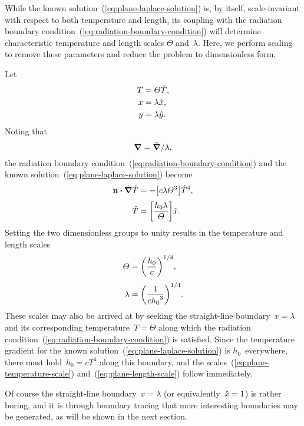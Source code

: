 While the known solution~(\ref{eq:plane-laplace-solution}) is, by itself,
scale-invariant with respect to both temperature and length,
its coupling with
the radiation boundary condition~(\ref{eq:radiation-boundary-condition})
will determine characteristic temperature and length scales
$\Theta$ and~$\lambda$.
Here, we perform scaling to remove these parameters
and reduce the problem to dimensionless form.

Let
\begin{align}
  T &= \varTheta \hat{T}, \label{eq:plane-temperature-scaling} \\
  x &= \lambda \hat{x}, \label{eq:plane-x-scaling} \\
  y &= \lambda \hat{y}. \label{eq:plane-y-scaling}
\end{align}
Noting that
\begin{equation}
  \mathop{}\!\boldsymbol{\mathbf{\nabla}} = \mathop{}\!\hat{\mathop{}\!\boldsymbol{\mathbf{\nabla}}} / \lambda,
  \label{eq:plane-del-scaling}
\end{equation}
the radiation boundary condition~(\ref{eq:radiation-boundary-condition})
and the known solution~(\ref{eq:plane-laplace-solution})
become
\begin{align}
  \normalvec \dotp \scaleddel \scaled{T}
    &= -\group{c \lambda \Theta^3} \scaled{T}^4,
    \label{eq:plane-scaled-radiation-boundary-condition-with-groups}
    \\[\tallspace]
  \scaled{T}
    &= \group{\frac{h_0 \lambda}{\Theta}} \scaled{x}.
    \label{eq:plane-scaled-laplace-solution-with-groups}
\end{align}
Setting the two dimensionless groups to unity
results in the temperature and length scales
\begin{align}
  \Theta &= \roundbr*{\frac{h_0}{c}}^{1/4},
    \label{eq:plane-temperature-scale} \\[\tallspace]
  \lambda &= \roundbr*{\frac{1}{c {h_0}^3}}^{1/4}.
    \label{eq:plane-length-scale}
\end{align}
These scales may also be arrived at
by seeking the straight-line boundary~$x = \lambda$
and its corresponding temperature~$T = \Theta$
along which the radiation condition~(\ref{eq:radiation-boundary-condition})
is satisfied.
Since the temperature gradient
for the known solution~(\ref{eq:plane-laplace-solution})
is $h_0$~everywhere,
there must hold~$h_0 = c T^4$ along this boundary,
and the scales~(\ref{eq:plane-temperature-scale})
and~(\ref{eq:plane-length-scale}) follow immediately.

Of course the straight-line boundary~$x = \lambda$
(or equivalently~$\hat{x} = 1$)
is rather boring,
and it is through boundary tracing
that more interesting boundaries may be generated,
as will be shown in the next section.

